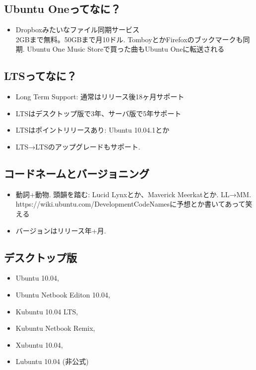 \documentclass[mingoth,a4paper]{jsarticle}
\begin{document}
\subsection{Ubuntu Oneってなに？}
\begin{itemize}
      \item Dropboxみたいなファイル同期サービス\\
    2GBまで無料。50GBまで月10ドル. TomboyとかFirefoxのブックマークも同期.
    Ubuntu One Music Storeで買った曲もUbuntu Oneに転送される
\end{itemize}

\subsection{LTSってなに？}
\begin{itemize}
      \item Long Term Support: 通常はリリース後18ヶ月サポート
      \item LTSはデスクトップ版で3年、サーバ版で5年サポート
      \item LTSはポイントリリースあり: Ubuntu 10.04.1とか
      \item LTS→LTSのアップグレードもサポート.
\end{itemize}

\subsection{コードネームとバージョニング}
\begin{itemize}
      \item  動詞+動物. 頭韻を踏む: Lucid Lynxとか、Maverick Meerkatとか. LL→MM. 
    https://wiki.ubuntu.com/DevelopmentCodeNamesに予想とか書いてあって笑える
    \item バージョンはリリース年+月. 
\end{itemize}

\subsection{デスクトップ版}

\begin{itemize}
      \item Ubuntu 10.04,
      \item Ubuntu Netbook Editon 10.04, 
      \item Kubuntu 10.04 LTS, 
      \item Kubuntu Netbook Remix, 
      \item Xubuntu 10.04, 
      \item Lubuntu 10.04 (非公式)
\end{itemize}
\end{document}
